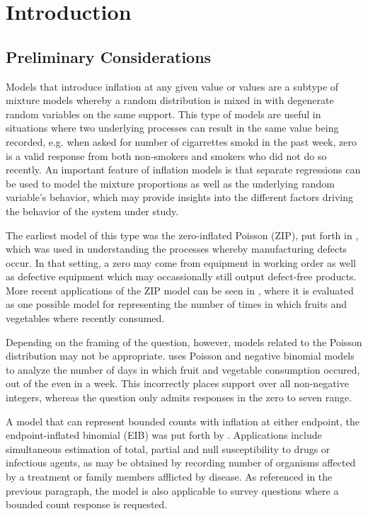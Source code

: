 \chapter{Introduction}
\label{cap:introduction}

\section{Preliminary Considerations}
\label{sec:introduction_preliminary-considerations}

Models that introduce inflation at any given value or values are a subtype of mixture models whereby a random distribution is mixed in with degenerate random variables on the same support. This type of models are useful in situations where two underlying processes can result in the same value being recorded, e.g. when asked for number of cigarrettes smokd in the past week, zero is a valid response from both non-smokers and smokers who did not do so recently. An important feature of inflation models is that separate regressions can be used to model the mixture proportions as well as the underlying random variable's behavior, which may provide insights into the different factors driving the behavior of the system under study.

The earliest model of this type was the zero-inflated Poisson (ZIP), put forth in \cite{lambert1992zero}, which was used in understanding the processes whereby manufacturing defects occur. In that setting, a zero may come from equipment in working order as well as defective equipment which may occassionally still output defect-free products. More recent applications of the ZIP model can be seen in \cite{wang2017availability}, where it is evaluated as one possible model for representing the number of times in which fruits and vegetables where recently consumed.

Depending on the framing of the question, however, models related to the Poisson distribution may not be appropriate. \cite{yen2011fruit} uses Poisson and negative binomial models to analyze the number of days in which fruit and vegetable consumption occured, out of the even in a week. This incorrectly places support over all non-negative integers, whereas the question only admits responses in the zero to seven range.

A model that can represent bounded counts with inflation at either endpoint, the endpoint-inflated binomial (EIB) was put forth by \cite{Tian2015}. Applications include simultaneous estimation of total, partial and null susceptibility to drugs or infectious agents, as may be obtained by recording number of organisms affected by a treatment or family members afflicted by disease. As referenced in the previous paragraph, the model is also applicable to survey questions where a bounded count response is requested.

